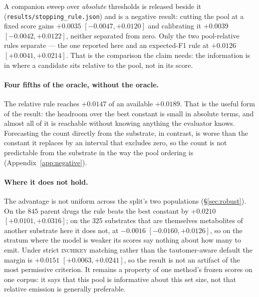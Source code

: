 A companion sweep over \emph{absolute} thresholds is released beside it
(\texttt{results/stopping\_rule.json}) and is a negative result: cutting the pool at a fixed score
gains $+0.0035$ $[-0.0047,+0.0120]$ and calibrating it $+0.0039$ $[-0.0042,+0.0122]$, neither
separated from zero. Only the two pool-relative rules separate --- the one reported here and an
expected-F1 rule at $+0.0126$ $[+0.0041,+0.0214]$. That is the comparison the claim needs: the
information is in where a candidate sits relative to the pool, not in its score.

\paragraph{Four fifths of the oracle, without the oracle.} The relative rule reaches $+0.0147$ of
an available $+0.0189$. That is the useful form of the result: the headroom over the best constant
is small in absolute terms, and almost all of it is reachable without knowing anything the evaluator
knows. Forecasting the count directly from the substrate, in contrast, is worse than the constant it
replaces by an interval that excludes zero, so the count is not predictable from the substrate in
the way the pool ordering is (Appendix~\ref{app:negative}).

\paragraph{Where it does not hold.} The advantage is not uniform across the split's two populations
(\S\ref{sec:robust}). On the $845$ parent drugs the rule beats the best constant by $+0.0210$
$[+0.0101,+0.0316]$; on the $325$ substrates that are themselves metabolites of another substrate
here it does not, at $-0.0016$ $[-0.0160,+0.0126]$, so on the stratum where the model is weaker its
scores say nothing about how many to emit. Under strict \textsc{inchikey} matching rather than the
tautomer-aware default the margin is $+0.0151$ $[+0.0063,+0.0241]$, so the result is not an artifact
of the most permissive criterion. It remains a property of one method's frozen scores on one corpus:
it says that this pool is informative about this set size, not that relative emission is generally
preferable.
